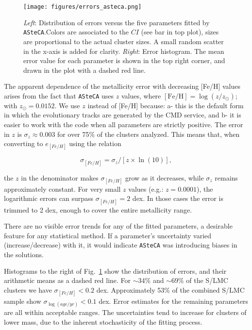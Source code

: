 \documentclass[draft]{aa}
\begin{document}
\begin{figure}[!ht]
\centering
\texttt{[image: figures/errors\_asteca.png]}
\caption{\emph{Left}: Distribution of errors versus the five parameters fitted
by \texttt{ASteCA}.\@ Colors are associated to the $CI$ (see bar in top plot),
sizes are proportional to the actual cluster sizes. A small random scatter in
the x-axis is added for clarity.
\emph{Right}: Error histogram. The mean error value for each parameter is shown
in the top right corner, and drawn in the plot with a dashed red line.}
\label{fig:errors}
\end{figure}

The apparent dependence of the metallicity error with decreasing [Fe/H] values
arises from the fact that \texttt{ASteCA} uses $z$ values, where
$\mathrm{[Fe/H]}{=}\log(z/z_{\odot})$; with $z_{\odot}{=}0.0152$. We use $z$
instead of [Fe/H] because: a- this is the default form in which the evolutionary
tracks are generated by the CMD service, and b- it is easier to work with the
code when all parameters are strictly positive.
The error in $z$ is $\sigma_z{\approx}0.003$ for over 75\% of the clusters
analyzed. This means that, when converting to $e_{[Fe/H]}$ using the relation

\begin{equation}
\sigma_{[Fe/H]} = \sigma_z/[z\times\ln(10)],
\end{equation}

\noindent the $z$ in the denominator makes $\sigma_{[Fe/H]}$ grow as it
decreases, while $\sigma_z$ remains approximately constant.
For very small $z$ values (e.g.: $z{=}0.0001$), the logarithmic errors can
surpass $\sigma_{[Fe/H]}{=}2$ dex. In those cases the error is trimmed to 2 dex,
enough to cover the entire metallicity range.

There are no visible error trends for any of the fitted parameters, a desirable
feature for any statistical method. If a parameter's uncertainty varied 
(increase/decrease) with it, it would indicate \texttt{ASteCA} was
introducing biases in the solutions.

Histograms to the right of Fig.~\ref{fig:errors} show the distribution
of errors, and their arithmetic means as a dashed red line.
For $\sim$34\% and ${\sim}69\%$ of the S/LMC clusters we have
$\sigma_{[Fe/H]}{<}0.2$ dex.
Approximately 53\% of the combined S/LMC sample show
$\sigma_{\log(age/yr)}{<}0.1$ dex. Error estimates for the remaining parameters
are all within acceptable ranges. The uncertainties tend to increase for
clusters of lower mass, due to the inherent stochasticity of the fitting
process.\\
\end{document}
